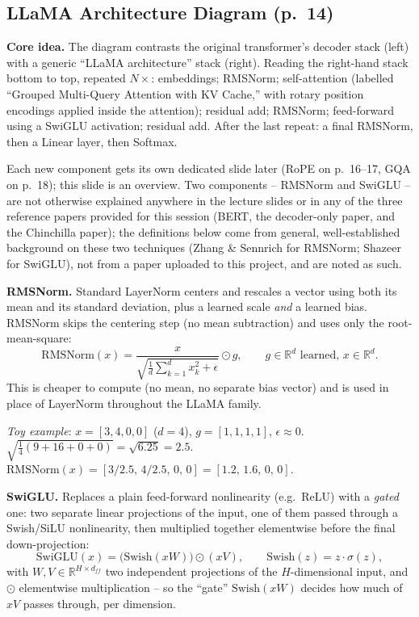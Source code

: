 \documentclass[11pt]{article}
\begin{document}
\subsection{LLaMA Architecture Diagram (p.\ 14)}

\textbf{Core idea.} The diagram contrasts the original transformer's decoder stack (left) with a generic ``LLaMA architecture'' stack (right). Reading the right-hand stack bottom to top, repeated $N\times$:
embeddings; RMSNorm; self-attention (labelled ``Grouped Multi-Query Attention with KV Cache,'' with rotary position encodings applied inside the attention); residual add; RMSNorm; feed-forward using a SwiGLU activation; residual add. After the last repeat: a final RMSNorm, then a Linear layer, then Softmax.

Each new component gets its own dedicated slide later (RoPE on p.\ 16--17, GQA on p.\ 18); this slide is an overview. Two components -- RMSNorm and SwiGLU -- are not otherwise explained anywhere in the lecture slides or in any of the three reference papers provided for this session (BERT, the decoder-only paper, and the Chinchilla paper); the definitions below come from general, well-established background on these two techniques (Zhang \& Sennrich for RMSNorm; Shazeer for SwiGLU), not from a paper uploaded to this project, and are noted as such.

\textbf{RMSNorm.} Standard LayerNorm centers and rescales a vector using both its mean and its standard deviation, plus a learned scale \emph{and} a learned bias. RMSNorm skips the centering step (no mean subtraction) and uses only the root-mean-square:
\[
\text{RMSNorm}(x) = \frac{x}{\sqrt{\frac{1}{d}\sum_{k=1}^{d}x_k^2 + \epsilon}} \odot g, \qquad g\in\mathbb{R}^d\text{ learned, } x\in\mathbb{R}^d.
\]
This is cheaper to compute (no mean, no separate bias vector) and is used in place of LayerNorm throughout the LLaMA family.

\emph{Toy example}: $x=[3,4,0,0]$ ($d=4$), $g=[1,1,1,1]$, $\epsilon\approx0$. $\sqrt{\tfrac{1}{4}(9+16+0+0)}=\sqrt{6.25}=2.5$. $\text{RMSNorm}(x) = [3/2.5,\,4/2.5,\,0,\,0]=[1.2,\,1.6,\,0,\,0]$.

\textbf{SwiGLU.} Replaces a plain feed-forward nonlinearity (e.g.\ ReLU) with a \emph{gated} one: two separate linear projections of the input, one of them passed through a Swish/SiLU nonlinearity, then multiplied together elementwise before the final down-projection:
\[
\text{SwiGLU}(x) = \big(\text{Swish}(xW)\big) \odot (xV), \qquad \text{Swish}(z) = z\cdot\sigma(z),
\]
with $W,V \in \mathbb{R}^{H\times d_{ff}}$ two independent projections of the $H$-dimensional input, and $\odot$ elementwise multiplication -- so the ``gate'' $\text{Swish}(xW)$ decides how much of $xV$ passes through, per dimension.
\end{document}
